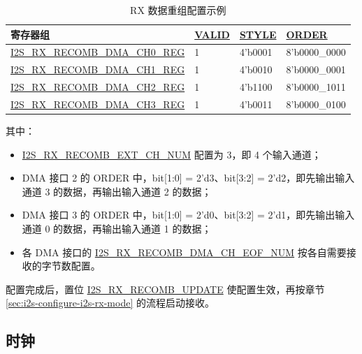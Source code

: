 \documentclass[main\_\_CN.tex]{subfiles}
\begin{document}
\begin{table}[H]
    \centering
    \caption{RX 数据重组配置示例}
    \label{tab:i2s-rx-recomb-example}
    \begin{tabular}{|p{6cm}|R{2.0cm}|R{2.6cm}|R{3.0cm}|}
    \hline
    \textbf{寄存器组} & \textbf{\hyperref[fielddesc:I2SRXRECOMBDMACH0VALID]{VALID}} & \textbf{\hyperref[fielddesc:I2SRXRECOMBDMACH0STYLE]{STYLE}} & \textbf{\hyperref[fielddesc:I2SRXRECOMBDMACH0ORDER]{ORDER}}\\ \hline
    \hyperref[regdesc:I2SRXRECOMBDMACH0REG]{I2S\_RX\_RECOMB\_DMA\_CH0\_REG} & 1 & 4'b0001 & 8'b0000\_0000 \\\hline
    \hyperref[regdesc:I2SRXRECOMBDMACH1REG]{I2S\_RX\_RECOMB\_DMA\_CH1\_REG} & 1 & 4'b0010 & 8'b0000\_0001 \\\hline
    \hyperref[regdesc:I2SRXRECOMBDMACH2REG]{I2S\_RX\_RECOMB\_DMA\_CH2\_REG} & 1 & 4'b1100 & 8'b0000\_1011 \\\hline
    \hyperref[regdesc:I2SRXRECOMBDMACH3REG]{I2S\_RX\_RECOMB\_DMA\_CH3\_REG} & 1 & 4'b0011 & 8'b0000\_0100 \\\hline
    \end{tabular}
\end{table}

其中：

\begin{itemize}
    \item \hyperref[fielddesc:I2SRXRECOMBEXTCHNUM]{I2S\_RX\_RECOMB\_EXT\_CH\_NUM} 配置为 3，即 4 个输入通道；
    \item DMA 接口 2 的 ORDER 中，bit[1:0] = 2'd3、bit[3:2] = 2'd2，即先输出输入通道 3 的数据，再输出输入通道 2 的数据；
    \item DMA 接口 3 的 ORDER 中，bit[1:0] = 2'd0、bit[3:2] = 2'd1，即先输出输入通道 0 的数据，再输出输入通道 1 的数据；
    \item 各 DMA 接口的 \hyperref[fielddesc:I2SRXRECOMBDMACH0EOFNUM]{I2S\_RX\_RECOMB\_DMA\_CH\_EOF\_NUM} 按各自需要接收的字节数配置。
\end{itemize}

配置完成后，置位 \hyperref[fielddesc:I2SRXRECOMBUPDATE]{I2S\_RX\_RECOMB\_UPDATE} 使配置生效，再按章节 \ref{sec:i2s-configure-i2s-rx-mode} \textit{} 的流程启动接收。

\subsection{时钟}\label{sec:i2s-tx-rx-clk}
\end{document}
